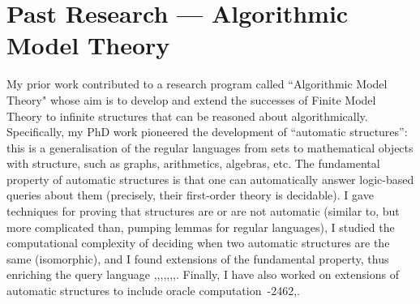 \documentclass[a4paper,10pt]{scrartcl}
\begin{document}
\section{Past Research --- Algorithmic Model Theory}
My prior work contributed to a research program called ``Algorithmic  Model Theory" whose aim is to develop and extend the successes of Finite Model Theory to infinite structures that can be reasoned about algorithmically. 
Specifically, my PhD work pioneered the development of ``automatic structures'': this is a generalisation of the regular languages from sets to mathematical objects with structure, such as graphs, arithmetics, algebras, etc.  The fundamental property of automatic structures is that one can automatically answer logic-based queries about them (precisely, their first-order theory is decidable). I gave techniques for proving that structures are or are not automatic (similar to, but more complicated than, pumping lemmas for regular languages), I studied the computational complexity of deciding when two automatic structures are the same (isomorphic), and I found extensions of the fundamental property, thus enriching the query language ,,,,,,,. 
Finally, I have also worked on extensions of automatic structures to include oracle computation~-2462,.
 


% 
% 



\end{document}
